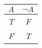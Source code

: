 
\begin{center}
\begin{tabular}{c||c}
 $A$ & $\lnot A$ \\
\hline
\emph{T} & \emph{F}  \\
\emph{F} & \emph{T} \\
\end{tabular}
\end{center}

